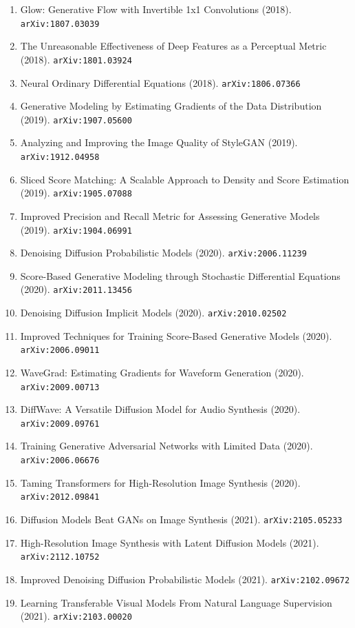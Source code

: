 \documentclass[11pt]{article}
\begin{document}
\begin{enumerate}
  \item Glow: Generative Flow with Invertible 1x1 Convolutions (2018). \texttt{arXiv:1807.03039}
  \item The Unreasonable Effectiveness of Deep Features as a Perceptual Metric (2018). \texttt{arXiv:1801.03924}
  \item Neural Ordinary Differential Equations (2018). \texttt{arXiv:1806.07366}
  \item Generative Modeling by Estimating Gradients of the Data Distribution (2019). \texttt{arXiv:1907.05600}
  \item Analyzing and Improving the Image Quality of StyleGAN (2019). \texttt{arXiv:1912.04958}
  \item Sliced Score Matching: A Scalable Approach to Density and Score
  Estimation (2019). \texttt{arXiv:1905.07088}
  \item Improved Precision and Recall Metric for Assessing Generative Models (2019). \texttt{arXiv:1904.06991}
  \item Denoising Diffusion Probabilistic Models (2020). \texttt{arXiv:2006.11239}
  \item Score-Based Generative Modeling through Stochastic Differential
  Equations (2020). \texttt{arXiv:2011.13456}
  \item Denoising Diffusion Implicit Models (2020). \texttt{arXiv:2010.02502}
  \item Improved Techniques for Training Score-Based Generative Models (2020). \texttt{arXiv:2006.09011}
  \item WaveGrad: Estimating Gradients for Waveform Generation (2020). \texttt{arXiv:2009.00713}
  \item DiffWave: A Versatile Diffusion Model for Audio Synthesis (2020). \texttt{arXiv:2009.09761}
  \item Training Generative Adversarial Networks with Limited Data (2020). \texttt{arXiv:2006.06676}
  \item Taming Transformers for High-Resolution Image Synthesis (2020). \texttt{arXiv:2012.09841}
  \item Diffusion Models Beat GANs on Image Synthesis (2021). \texttt{arXiv:2105.05233}
  \item High-Resolution Image Synthesis with Latent Diffusion Models (2021). \texttt{arXiv:2112.10752}
  \item Improved Denoising Diffusion Probabilistic Models (2021). \texttt{arXiv:2102.09672}
  \item Learning Transferable Visual Models From Natural Language Supervision (2021). \texttt{arXiv:2103.00020}

\end{enumerate}
\end{document}
